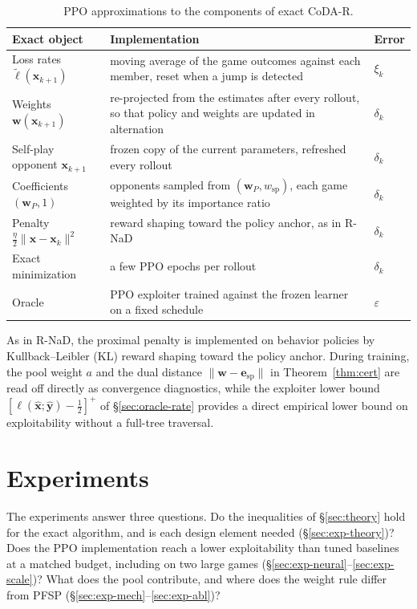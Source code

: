 \documentclass{article}
\theoremstyle{plain}
\theoremstyle{remark}
\newcommand{\bx}{{\bm{x}}}
\newcommand{\by}{{\bm{y}}}
\newcommand{\bw}{{\bm{w}}}
\newcommand{\be}{{\bm{e}}}
\newcommand{\bell}{{\bm{\ell}}}
\newcommand{\aug}{\tilde{\bell}}
\newcommand{\esp}{\be_{\mathrm{sp}}}
\newcommand{\wsp}{w_{\mathrm{sp}}}
\newcommand{\codar}{CoDA-R}
\begin{document}
\begin{table}[t]
\caption{PPO approximations to the components of exact \codar{}.}
\label{tab:impl}
\begin{center}
\footnotesize
\setlength{\tabcolsep}{4pt}
\begin{tabular}{p{3.6cm}p{8.2cm}l}
\toprule
Exact object & Implementation & Error \\
\midrule
Loss rates $\aug(\bx_{k+1})$ & moving average of the game outcomes against each member, reset when a jump is detected & $\xi_k$ \\
Weights $\bw(\bx_{k+1})$ & re-projected from the estimates after every rollout, so that policy and weights are updated in alternation & $\delta_k$ \\
Self-play opponent $\bx_{k+1}$ & frozen copy of the current parameters, refreshed every rollout & $\delta_k$ \\
Coefficients $(\bw_P,1)$ & opponents sampled from $(\bw_P,\wsp)$, each game weighted by its importance ratio & $\delta_k$ \\
Penalty $\tfrac\eta2\|\bx-\bx_k\|^2$ & reward shaping toward the policy anchor, as in R-NaD & $\delta_k$ \\
Exact minimization & a few PPO epochs per rollout & $\delta_k$ \\
Oracle & PPO exploiter trained against the frozen learner on a fixed schedule & $\varepsilon$ \\
\bottomrule
\end{tabular}
\end{center}
\end{table}

As in R-NaD, the proximal penalty is implemented on behavior policies by Kullback--Leibler (KL) reward shaping toward the policy anchor. During training, the pool weight $a$ and the dual distance $\|\bw-\esp\|$ in Theorem~\ref{thm:cert} are read off directly as convergence diagnostics, while the exploiter lower bound $[\ell(\hat\bx;\hat\by)-\tfrac12]^+$ of \S\ref{sec:oracle-rate} provides a direct empirical lower bound on exploitability without a full-tree traversal.

\section{Experiments}
\label{sec:exp}

The experiments answer three questions. Do the inequalities of \S\ref{sec:theory} hold for the exact algorithm, and is each design element needed (\S\ref{sec:exp-theory})? Does the PPO implementation reach a lower exploitability than tuned baselines at a matched budget, including on two large games (\S\ref{sec:exp-neural}--\ref{sec:exp-scale})? What does the pool contribute, and where does the weight rule differ from PFSP (\S\ref{sec:exp-mech}--\ref{sec:exp-abl})?
\end{document}
